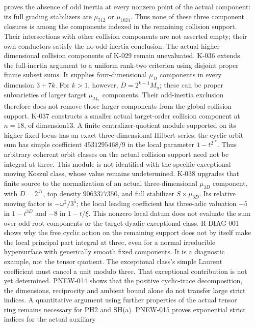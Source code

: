 \documentclass[11pt]{article}
\theoremstyle{definition}\newtheorem{definition}[theorem]{Definition}
\theoremstyle{remark}\newtheorem{remark}[theorem]{Remark}
\begin{document}
proves the absence of odd inertia at every nonzero point of the actual
component: its full grading stabilizers are $\mu_{512}$ or $\mu_{1024}$.
Thus none of these three component closures is among the components
indexed in the remaining collision support. Their intersections with
other collision components are not asserted empty; their own
conductors satisfy the no-odd-inertia conclusion. The actual
higher-dimensional collision components of K-029 remain unevaluated.
K-036 extends the full-inertia argument to a uniform rank-two
criterion using disjoint proper frame subset sums. It supplies
four-dimensional $\mu_D$ components in every dimension $3+7k$.
For $k>1$, however, $D=2^{k-1}M_n$; these can be proper
subvarieties of larger target $\mu_{M_n}$ components. Their
odd-inertia exclusion therefore does not remove those larger
components from the global collision support.
K-037 constructs a smaller actual target-order collision component
at $n=18$, of dimension13. A finite centralizer-quotient module
supported on its higher fixed locus has an exact three-dimensional
Hilbert series; the cyclic orbit sum has simple coefficient
$4531295468/9$ in the local parameter $1-t^{2^{17}}$.
Thus arbitrary coherent orbit classes on the actual collision
support need not be integral at three. This module is not
identified with the specific exceptional moving Koszul class,
whose value remains undetermined.
K-038 upgrades that finite source to the normalization of an actual
three-dimensional $\mu_{3D}$ component, with $D=2^{17}$, top density
$9063377350$, and full stabilizer $S\times\mu_{3D}$.
Its relative moving factor is $-\omega^2/3^5$; the local leading
coefficient has three-adic valuation $-5$ in $1-t^{3D}$ and $-8$
in $1-t/\xi$. This nonzero local datum does not evaluate the sum
over odd-root components or the target-dyadic exceptional class.
R-DIAG-001 shows why the free cyclic action on the remaining support
does not by itself make the local principal part integral at three,
even for a normal irreducible hypersurface with generically smooth
fixed components. It is a diagnostic example, not the tensor quotient.
The exceptional class's simple Laurent coefficient must
cancel a unit modulo three. That exceptional contribution is not yet
determined. PNEW-014 shows that the positive cyclic-trace decomposition,
the dimensions, reciprocity and ambient bound alone do not transfer
large strict indices. A quantitative argument using further properties
of the actual tensor ring remains necessary for PH2 and SH(a).
PNEW-015 proves exponential strict indices for the actual auxiliary
\end{document}
